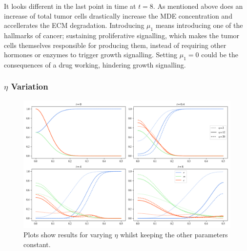 It looks different in the last point in time at $t=8$. As mentioned above does an increase of total tumor cells drastically increase the MDE concentration and accellerates the ECM degradation.\newline
Introducing $\mu_1$ means introducing one of the hallmarks of cancer; sustaining proliferative signalling, which makes the tumor cells themselves responsible for producing them, instead of requiring other hormones or enzymes to trigger growth signalling. Setting $\mu_1=0$ could be the consequences of a drug working, hindering growth signalling.

\subsubsection*{$\eta$ Variation}
\begin{figure}[h]
    \centering
    \includegraphics[width=\textwidth]{resources/images/prolif_eta_variation.png}
    \caption{Plots show results for varying $\eta$ whilst keeping the other parameters constant.}
    \label{fig:prolif_eta_variation}
\end{figure}

